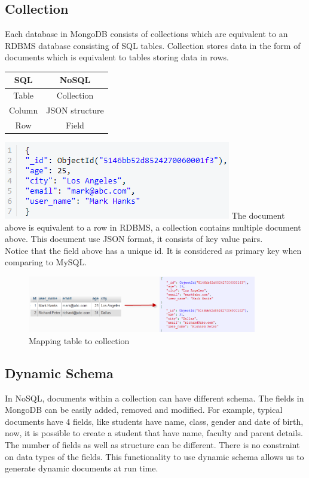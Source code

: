 \documentclass[conference]{IEEEtran}
\begin{document}
\subsection{Collection}
Each database in MongoDB consists of collections which are equivalent to an RDBMS database consisting of SQL tables.
Collection stores data in the form of documents which is equivalent to tables storing data in rows.
\begin{center}
 \begin{tabular}{||c c||} 
 \hline
   SQL & NoSQL  \\ [0.5ex] 
 \hline\hline
 Table & Collection  \\ 
 \hline
 Column & JSON structure   \\
 \hline
 Row & Field\\
 [1ex] 
 \hline
\end{tabular}
\end{center}
\includegraphics{collection}
The document above is equivalent to a row in RDBMS, a collection contains multiple document above. This document use JSON format, it consists of key value pairs.
\\
Notice that the field above has a unique id. It is considered as primary key when comparing to MySQL.
\begin{figure}[H]
    \centering
    \includegraphics[width=10cm]{collection_mapping}
    \caption{Mapping table to collection~\cite{4}}
    \label{fig:fig4}
\end{figure}
\subsection{Dynamic Schema}
In NoSQL, documents within a collection can have different schema. The fields in MongoDB can be easily added, removed and modified. For example, typical documents have 4 fields, like students have name, class, gender and date of birth, now, it is possible to create a student that have name, faculty and parent details. The number of fields as well as structure can be different. There is no constraint on data types of the fields. This functionality to use dynamic schema allows us to generate dynamic documents at run time.
\end{document}
